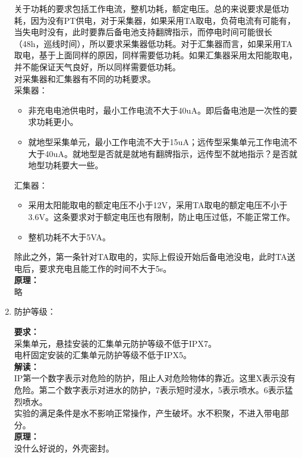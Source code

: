 \documentclass{article}
\begin{document}
\begin{CJK}{UTF8}{gbsn}
\begin{enumerate}
	关于功耗的要求包括工作电流，整机功耗，额定电压。总的来说要求是低功耗，因为没有PT供电，对于采集器，如果采用TA取电，负荷电流有可能有，当失电时没有，此时要靠后备电池支持翻牌指示，而停电时间可能很长（48h，巡线时间），所以要求采集器低功耗。对于汇集器而言，如果采用TA取电，基于上面同样的原因，同样需要低功耗。如果汇集器采用太阳能取电，并不能保证天气良好，所以同样需要低功耗。\\
	对采集器和汇集器有不同的功耗要求。\\
	采集器：
	\begin{itemize}
			\item 非充电电池供电时，最小工作电流不大于40uA。即后备电池是一次性的要求功耗更小。
			\item 就地型采集单元，最小工作电流不大于15uA；远传型采集单元工作电流不大于40uA。就地型是否就是就地有翻牌指示，远传型不就地指示？是否就地型功耗要大一些。
	\end{itemize}
	汇集器：
	\begin{itemize}
			\item 采用太阳能取电的额定电压不小于12V，采用TA取电的额定电压不小于3.6V。这条要求对于额定电压也有限制，防止电压过低，不能正常工作。
			\item 整机功耗不大于5VA。
	\end{itemize}
	除此之外，第一条针对TA取电的，实际上假设开始后备电池没电，此时TA送电后，要求充电且能工作的时间不大于5s。\\
	\textbf{原理：}\\
	略
\item 防护等级：
	\par
	\textbf{要求：}\\
	采集单元，悬挂安装的汇集单元防护等级不低于IPX7。\\
	电杆固定安装的汇集单元防护等级不低于IPX5。\\
	\textbf{解读：}\\
	IP第一个数字表示对危险的防护，阻止人对危险物体的靠近。这里X表示没有危险。第二个数字表示对进水的防护，7表示短时浸水，5表示喷水。6表示猛烈喷水。\\
	实验的满足条件是水不影响正常操作，产生破坏。水不积聚，不进入带电部分。\\
	\textbf{原理：}\\
	没什么好说的，外壳密封。

\end{enumerate}

\end{CJK}
\end{document}
